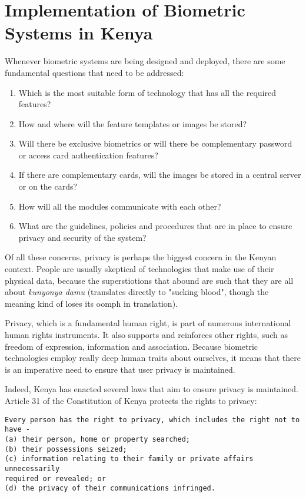 \documentclass[12pt]{report}
\begin{document}
\chapter{Implementation of Biometric Systems in Kenya}
Whenever biometric systems are being designed and deployed, there are some fundamental questions that need to be addressed:

\begin{enumerate}
\item Which is the most suitable form of technology that has all the required features?
\item How and where will the feature templates or images be stored?
\item Will there be exclusive biometrics or will there be complementary password or access card authentication features?
\item If there are complementary cards, will the images be stored in a central server or on the cards?
\item How will all the modules communicate with each other?
\item What are the guidelines, policies and procedures that are in place to ensure privacy and security of the system?
\end{enumerate}


Of all these concerns, privacy is perhaps the biggest concern in the Kenyan context. People are usually skeptical of technologies that make use of their physical data, because the superstiotions that abound are such that they are all about \emph{kunyonya damu} (translates directly to "sucking blood", though the meaning kind of loses its oomph in translation).

Privacy, which is a fundamental human right, is part of numerous international human rights
instruments. It also supports and reinforces other rights, such as freedom of expression, information and association. Because biometric technologies employ really deep human traits about ourselves, it means that there is an imperative need to ensure that user privacy is maintained. 

Indeed, Kenya has enacted several laws that aim to ensure privacy is maintained. Article 31 of the Constitution of Kenya protects the rights to privacy:

\begin{verbatim}
Every person has the right to privacy, which includes the right not to
have -
(a) their person, home or property searched;
(b) their possessions seized;
(c) information relating to their family or private affairs unnecessarily
required or revealed; or
(d) the privacy of their communications infringed.
\end{verbatim}
\end{document}
